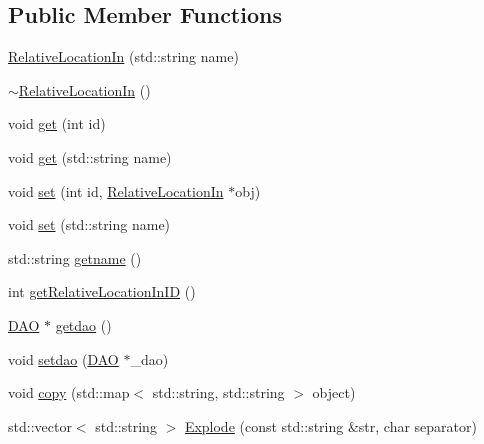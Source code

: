 \subsection*{Public Member Functions}
\begin{DoxyCompactItemize}
\item 
\hyperlink{class_relative_location_in_ac635fc76f5c0bb7927dfcc136f91c62b}{RelativeLocationIn} (std::string name)
\item 
\hyperlink{class_relative_location_in_a05d436d72b03110fb5df9a7a7c89c65e}{$\sim$RelativeLocationIn} ()
\item 
void \hyperlink{class_relative_location_in_ad3c625cef3df3f1900ae07cd35206cd1}{get} (int id)
\item 
void \hyperlink{class_relative_location_in_a9fceea9cfff69f10c2d4f232b6cdf978}{get} (std::string name)
\item 
void \hyperlink{class_relative_location_in_aca076ad267e81fba9c64123f3ce5c1cc}{set} (int id, \hyperlink{class_relative_location_in}{RelativeLocationIn} $\ast$obj)
\item 
void \hyperlink{class_relative_location_in_abe3029770e3c23c2930a880299832bb7}{set} (std::string name)
\item 
std::string \hyperlink{class_relative_location_in_a6a3f7623911d954ee50c3231c93f2b7c}{getname} ()
\item 
int \hyperlink{class_relative_location_in_af5973ea437e6d1e9cb9ebcfd7af21ac0}{getRelativeLocationInID} ()
\item 
\hyperlink{class_d_a_o}{DAO} $\ast$ \hyperlink{class_relative_location_in_ab695d2876ac7cf7f56f4266380ab8cca}{getdao} ()
\item 
void \hyperlink{class_relative_location_in_a62d119b3aac2aa9e728878a85971c7ce}{setdao} (\hyperlink{class_d_a_o}{DAO} $\ast$\_\-dao)
\item 
void \hyperlink{class_relative_location_in_aea9c6c62540f8dbc4d93accd2904524d}{copy} (std::map$<$ std::string, std::string $>$ object)
\item 
std::vector$<$ std::string $>$ \hyperlink{class_relative_location_in_abe2fce096ef163a2d6560475eb7850fb}{Explode} (const std::string \&str, char separator)
\end{DoxyCompactItemize}


